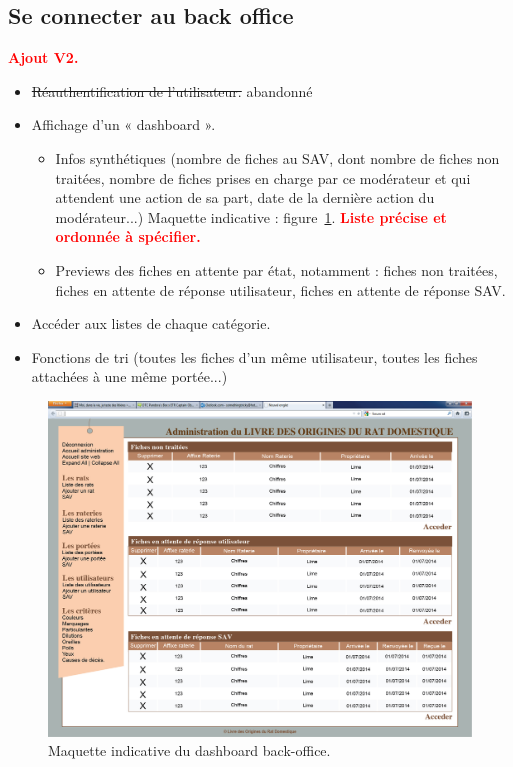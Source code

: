 \documentclass[a4paper,10pt]{article}
\newcommand\desire[1]{\noindent\textbf{\textcolor{red}{#1}}}
\begin{document}
\subsection{Se connecter au back office}
\desire{Ajout V2.} 
\begin{itemize}
\item \sout{Réauthentification de l'utilisateur.} abandonné 
\item Affichage d'un « dashboard ».
\begin{itemize}
\item Infos synthétiques (nombre de fiches au SAV, dont nombre de fiches non traitées, nombre de fiches prises en charge par ce modérateur et qui attendent une action de sa part, date de la dernière action du modérateur...) Maquette indicative : figure~\ref{fig:kerdashback}. \desire{Liste précise et ordonnée à spécifier.}
\item Previews des fiches en attente par état, notamment : fiches non traitées, fiches en attente de réponse utilisateur, fiches en attente de réponse SAV.
\end{itemize}
\item Accéder aux listes de chaque catégorie.
\item Fonctions de tri (toutes les fiches d'un même utilisateur, toutes les fiches attachées à une même portée...)
\end{itemize}

\begin{figure}[htbp]%
\begin{center}\includegraphics[width=0.8\linewidth]{MaquetteSAV.jpg}\end{center}
\caption{Maquette indicative du dashboard back-office.\label{fig:kerdashback}}
\end{figure}
\end{document}
